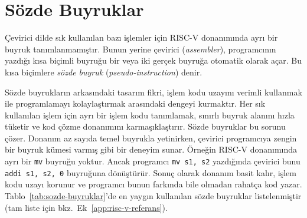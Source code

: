 \section{Sözde Buyruklar}
\label{sec:sozde-buyruklar}

Çevirici dilde sık kullanılan bazı işlemler için RISC-V donanımında ayrı bir buyruk tanımlanmamıştır. Bunun yerine çevirici (\textit{assembler}), programcının yazdığı kısa biçimli buyruğu bir veya iki gerçek buyruğa otomatik olarak açar. Bu kısa biçimlere \emph{sözde buyruk} (\textit{pseudo-instruction}) denir.

Sözde buyrukların arkasındaki tasarım fikri, işlem kodu uzayını verimli kullanmak ile programlamayı kolaylaştırmak arasındaki dengeyi kurmaktır. Her sık kullanılan işlem için ayrı bir işlem kodu tanımlamak, sınırlı buyruk alanını hızla tüketir ve kod çözme donanımını karmaşıklaştırır. Sözde buyruklar bu sorunu çözer. Donanım az sayıda temel buyrukla yetinirken, çevirici programcıya zengin bir buyruk kümesi varmış gibi bir deneyim sunar. Örneğin RISC-V donanımında ayrı bir \texttt{mv} buyruğu yoktur. Ancak programcı \texttt{mv s1, s2} yazdığında çevirici bunu \texttt{addi s1, s2, 0} buyruğuna dönüştürür. Sonuç olarak donanım basit kalır, işlem kodu uzayı korunur ve programcı bunun farkında bile olmadan rahatça kod yazar. Tablo~\ref{tab:sozde-buyruklar}'de en yaygın kullanılan sözde buyruklar listelenmiştir (tam liste için bkz.\ Ek~\ref{app:risc-v-referans}).

